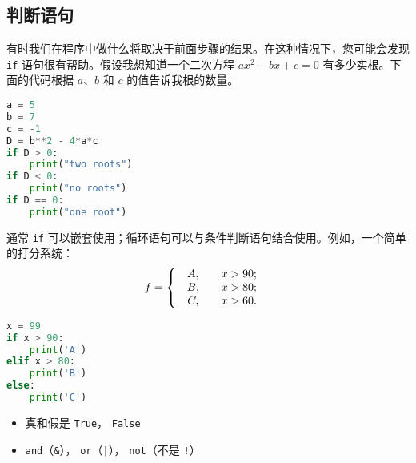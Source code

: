 
\begin{issues}
\end{issues}


\subsection{判断语句}
有时我们在程序中做什么将取决于前面步骤的结果。在这种情况下，您可能会发现 \verb|if| 语句很有帮助。假设我想知道一个二次方程 $ax^2+bx+c=0$ 有多少实根。下面的代码根据 $a$、$b$ 和 $c$ 的值告诉我根的数量。
\begin{lstlisting}[language=python]
a = 5
b = 7
c = -1 
D = b**2 - 4*a*c
if D > 0:
    print("two roots")
if D < 0:
    print("no roots")
if D == 0:
    print("one root")
\end{lstlisting}

通常 \verb|if| 可以嵌套使用；循环语句可以与条件判断语句结合使用。例如，一个简单的打分系统：
\begin{equation}
f=\left\{\begin{array}{lc}\begin{array}{c}A, \\B, \\C, \end{array}&\begin{array}{c}x>90; \\x>80; \\x>60.\end{array}\end{array}\right.\\\\
\end{equation}
\begin{lstlisting}[language=python]
x = 99
if x > 90:
    print('A')
elif x > 80:
    print('B')
else:
    print('C')
\end{lstlisting}


\begin{itemize}
\item 真和假是 \verb|True|， \verb|False|
\item \verb|and|（\verb|&|）， \verb|or|（\verb`|`）， \verb|not|（不是 \verb|!|）
\end{itemize}


